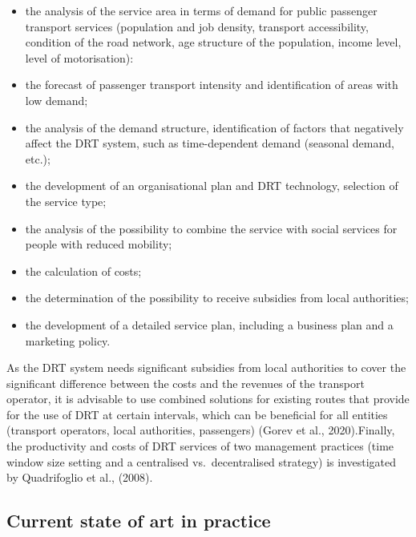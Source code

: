 \documentclass[
]{book}
\providecommand{\tightlist}{%
  \setlength{\itemsep}{0pt}\setlength{\parskip}{0pt}}
\begin{document}
\begin{itemize}
\tightlist
\item
  the analysis of the service area in terms of demand for public passenger transport services (population and job density, transport accessibility, condition of the road network, age structure of the population, income level, level of motorisation):
\item
  the forecast of passenger transport intensity and identification of areas with low demand;
\item
  the analysis of the demand structure, identification of factors that negatively affect the DRT system, such as time-dependent demand (seasonal demand, etc.);
\item
  the development of an organisational plan and DRT technology, selection of the service type;
\item
  the analysis of the possibility to combine the service with social services for people with reduced mobility;
\item
  the calculation of costs;
\item
  the determination of the possibility to receive subsidies from local authorities;
\item
  the development of a detailed service plan, including a business plan and a marketing policy.
\end{itemize}

As the DRT system needs significant subsidies from local authorities to cover the significant difference between the costs and the revenues of the transport operator, it is advisable to use combined solutions for existing routes that provide for the use of DRT at certain intervals, which can be beneficial for all entities (transport operators, local authorities, passengers) (Gorev et al., 2020).Finally, the productivity and costs of DRT services of two management practices (time window size setting and a centralised vs.~decentralised strategy) is investigated by Quadrifoglio et al., (2008).

\hypertarget{current-state-of-art-in-practice-22}{%
\subsection*{Current state of art in practice}\label{current-state-of-art-in-practice-22}}
\end{document}
